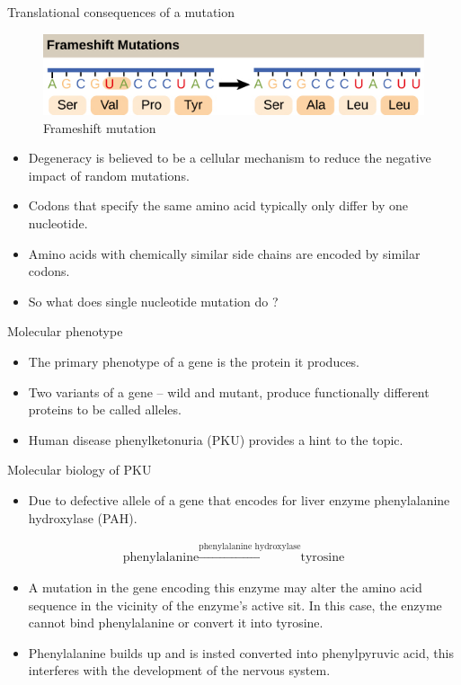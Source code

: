 \documentclass[11pt,dvipsnames,ignorenonframetext,aspectratio=169]{beamer}
\providecommand{\tightlist}{%
  \setlength{\itemsep}{0pt}\setlength{\parskip}{0pt}}
\begin{document}
\begin{frame}{Translational consequences of a mutation}
\protect\hypertarget{translational-consequences-of-a-mutation}{}
\begin{figure}
\includegraphics[width=0.45\linewidth]{./../images/frameshift_mutation} \caption{Frameshift mutation}\label{fig:frameshift-mutation}
\end{figure}

\begin{itemize}
\tightlist
\item
  Degeneracy is believed to be a cellular mechanism to reduce the
  negative impact of random mutations.
\item
  Codons that specify the same amino acid typically only differ by one
  nucleotide.
\item
  Amino acids with chemically similar side chains are encoded by similar
  codons.
\item
  So what does single nucleotide mutation do ?
\end{itemize}
\end{frame}

\begin{frame}{Molecular phenotype}
\protect\hypertarget{molecular-phenotype}{}
\begin{itemize}
\tightlist
\item
  The primary phenotype of a gene is the protein it produces.
\item
  Two variants of a gene -- wild and mutant, produce functionally
  different proteins to be called alleles.
\item
  Human disease phenylketonuria (PKU) provides a hint to the topic.
\end{itemize}
\end{frame}

\begin{frame}{Molecular biology of PKU}
\protect\hypertarget{molecular-biology-of-pku}{}
\begin{itemize}
\tightlist
\item
  Due to defective allele of a gene that encodes for liver enzyme
  phenylalanine hydroxylase (PAH).
\end{itemize}

\[
\begin{aligned}
\textrm{phenylalanine} \xrightarrow{\text{phenylalanine hydroxylase}} \textrm{tyrosine}
\end{aligned}
\]

\begin{itemize}
\tightlist
\item
  A mutation in the gene encoding this enzyme may alter the amino acid
  sequence in the vicinity of the enzyme's active sit. In this case, the
  enzyme cannot bind phenylalanine or convert it into tyrosine.
\item
  Phenylalanine builds up and is insted converted into phenylpyruvic
  acid, this interferes with the development of the nervous system.
\end{itemize}
\end{frame}
\end{document}
